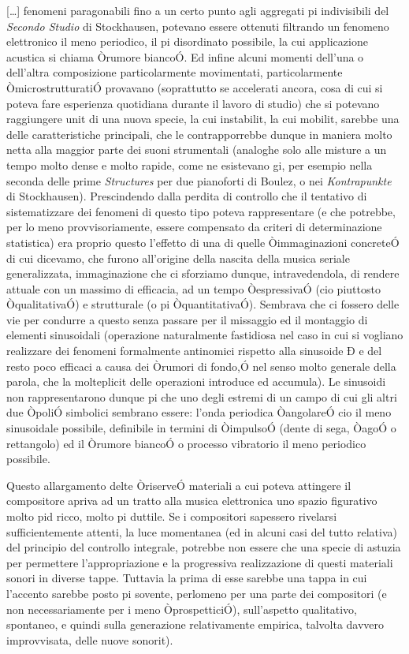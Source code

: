 [\ldots] fenomeni paragonabili fino a un certo punto agli aggregati pi indivisibili del \textit{Secondo Studio} di Stockhausen, potevano essere ottenuti filtrando un fenomeno elettronico il meno periodico, il pi disordinato possibile, la cui applicazione acustica si chiama Òrumore biancoÓ. Ed infine alcuni momenti dell'una o dell'altra composizione particolarmente movimentati, particolarmente ÒmicrostrutturatiÓ provavano (soprattutto se accelerati ancora, cosa di cui si poteva fare esperienza quotidiana durante il lavoro di studio) che si potevano raggiungere unit di una nuova specie, la cui instabilit, la cui mobilit, sarebbe una delle caratteristiche principali, che le contrapporrebbe dunque in maniera molto netta alla maggior parte dei suoni strumentali (analoghe solo alle misture a un tempo molto dense e molto rapide, come ne esistevano gi, per esempio nella seconda delle prime \textit{Structures} per due pianoforti di Boulez, o nei \textit{Kontrapunkte} di Stockhausen). Prescindendo dalla perdita di controllo che il tentativo di sistematizzare dei fenomeni di questo tipo poteva rappresentare (e che potrebbe, per lo meno provvisoriamente, essere compensato da criteri di determinazione statistica) era proprio questo l'effetto di una di quelle Òimmaginazioni concreteÓ di cui dicevamo, che furono all'origine della nascita della musica seriale generalizzata, immaginazione che ci sforziamo dunque, intravedendola, di rendere attuale con un massimo di efficacia, ad un tempo ÒespressivaÓ (cio piuttosto ÒqualitativaÓ) e strutturale (o pi ÒquantitativaÓ). Sembrava che ci fossero delle vie per condurre a questo senza passare per il missaggio ed il montaggio di elementi sinusoidali (operazione naturalmente fastidiosa nel caso in cui si vogliano realizzare dei fenomeni formalmente antinomici rispetto alla sinusoide Ð e del resto poco efficaci a causa dei Òrumori di fondo,Ó nel senso molto generale della parola, che la molteplicit delle operazioni introduce ed accumula). Le sinusoidi non rappresentarono dunque pi che uno degli estremi di un campo di cui gli altri due ÒpoliÓ simbolici sembrano essere: l'onda periodica ÒangolareÓ cio il meno sinusoidale possibile, definibile in termini di ÒimpulsoÓ (dente di sega, ÒagoÓ o rettangolo) ed il Òrumore biancoÓ o processo vibratorio il meno periodico possibile.

Questo allargamento delte ÒriserveÓ materiali a cui poteva attingere il compositore apriva ad un tratto alla musica elettronica uno spazio figurativo molto pid ricco, molto pi duttile. Se i compositori sapessero rivelarsi sufficientemente attenti, la luce momentanea (ed in alcuni casi del tutto relativa) del principio del controllo integrale, potrebbe non essere che una specie di astuzia per permettere l'appropriazione e la progressiva realizzazione di questi materiali sonori in diverse tappe. Tuttavia la prima di esse sarebbe una tappa in cui l'accento sarebbe posto pi sovente, perlomeno per una parte dei compositori (e non necessariamente per i meno ÒprospetticiÓ), sull'aspetto qualitativo, spontaneo, e quindi sulla generazione relativamente empirica, talvolta davvero improvvisata, delle nuove sonorit).

